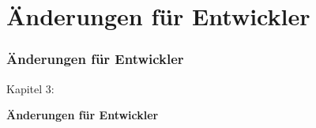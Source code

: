 %

\section{Änderungen für Entwickler}
\begin{frame}[fragile]
	\frametitle{Änderungen für Entwickler}

	\begin{center}\huge{Kapitel 3:}\end{center}
	\begin{center}\huge{\color{typo3darkgrey}\textbf{Änderungen für Entwickler}}\end{center}

\end{frame}



